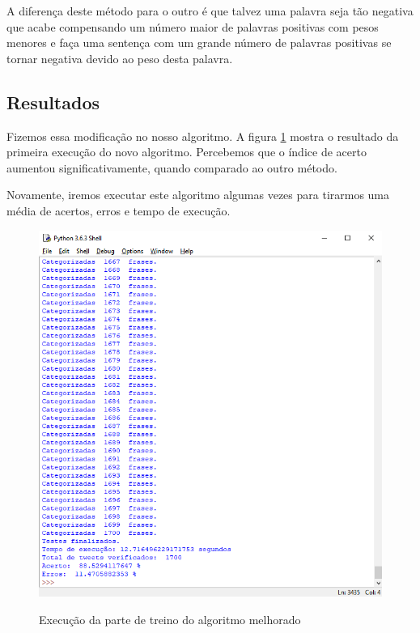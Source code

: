 \documentclass[
article,			%
12pt,				%
a4paper,			%
english,			%
brazil,				%
sumario=tradicional,
twoside
]{abntex2}
\begin{document}
	A diferença deste método para o outro é que talvez uma palavra seja tão negativa que acabe compensando um número maior de palavras positivas com pesos menores e faça uma sentença com um grande número de palavras positivas se tornar negativa devido ao peso desta palavra.
	
	\subsection{Resultados}
	Fizemos essa modificação no nosso algoritmo. A figura \ref{fig: melhoria1} mostra o resultado da primeira execução do novo algoritmo. Percebemos que o índice de acerto aumentou significativamente, quando comparado ao outro método.
	
	Novamente, iremos executar este algoritmo algumas vezes para tirarmos uma média de acertos, erros e tempo de execução.
	
	\begin{figure}[h!]
		\centering
		\caption{Execução da parte de treino do algoritmo melhorado}
		\includegraphics[scale=1]{melhoria1.png}
		\label{fig: melhoria1}
	\end{figure}
\end{document}

